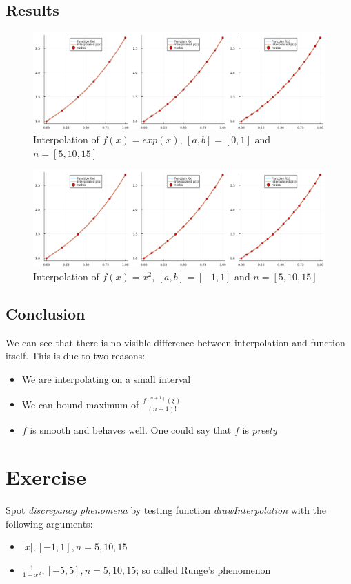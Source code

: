 \documentclass[11pt]{article}
\begin{document}
\subsection*{Results} 
\begin{figure}[h]
    \centering
    \includegraphics[width=1\textwidth]{ex5_plot1.png}
    \caption{Interpolation of $f(x)=exp(x)$, $[a,b] = [0,1]$ and $n = [5,10,15]$}
\end{figure}
\begin{figure}[h]
    \centering
    \includegraphics[width=1\textwidth]{ex5_plot1.png}
    \caption{Interpolation of $f(x)=x^2$, $[a,b] = [-1,1]$ and $n = [5,10,15]$}
\end{figure}
\subsection*{Conclusion}
We can see that there is no visible difference between interpolation and function itself. 
This is due to two reasons:
\begin{itemize}
    \item We are interpolating on a small interval
    \item We can bound maximum of $\frac{f^{(n+1)}(\xi)}{(n+1)!}$
    \item $f$ is smooth and behaves well. One could say that $f$ is \textit{preety}
\end{itemize}
\section{Exercise}
Spot \textit{discrepancy phenomena} by testing function \textit{drawInterpolation} with the following arguments:
\begin{itemize}
    \item $|x|, [-1, 1], n=5,10,15$
    \item $\frac{1}{1+x^2}, [-5, 5], n=5,10,15$; so called Runge's phenomenon
\end{itemize}
\end{document}

